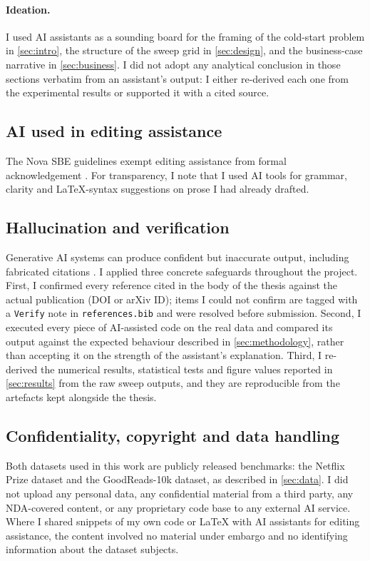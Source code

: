 \paragraph{Ideation.} I used AI assistants as a sounding board for the framing of the cold-start problem in \cref{sec:intro}, the structure of the sweep grid in \cref{sec:design}, and the business-case narrative in \cref{sec:business}. I did not adopt any analytical conclusion in those sections verbatim from an assistant's output: I either re-derived each one from the experimental results or supported it with a cited source.

\subsection*{AI used in editing assistance}

The Nova SBE guidelines exempt editing assistance from formal acknowledgement
\citep{novasbe-genai}. For transparency, I note that I used AI tools for
grammar, clarity and LaTeX-syntax suggestions on prose I had already drafted.

\subsection*{Hallucination and verification}

Generative AI systems can produce confident but inaccurate output, including
fabricated citations \citep{novasbe-genai}. I applied three concrete safeguards
throughout the project. First, I confirmed every reference cited in the body
of the thesis against the actual publication (DOI or arXiv ID); items I could
not confirm are tagged with a \texttt{Verify} note in \texttt{references.bib}
and were resolved before submission. Second, I executed every piece of
AI-assisted code on the real data and compared its output against the expected
behaviour described in \cref{sec:methodology}, rather than accepting it on the
strength of the assistant's explanation. Third, I re-derived the numerical
results, statistical tests and figure values reported in \cref{sec:results}
from the raw sweep outputs, and they are reproducible from the artefacts kept
alongside the thesis.

\subsection*{Confidentiality, copyright and data handling}

Both datasets used in this work are publicly released benchmarks: the Netflix
Prize dataset and the GoodReads-10k dataset, as described in
\cref{sec:data}. I did not upload any personal data, any confidential material
from a third party, any NDA-covered content, or any proprietary code base to
any external AI service. Where I shared snippets of my own code or LaTeX with
AI assistants for editing assistance, the content involved no material under
embargo and no identifying information about the dataset subjects.

